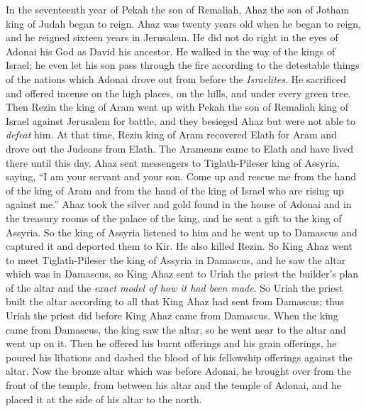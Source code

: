 \begin{biblechapter} %
 In the seventeenth year of Pekah the son of Remaliah, Ahaz the son of Jotham king of Judah began to reign.
\verse Ahaz was twenty years old when he began to reign, and he reigned sixteen years in Jerusalem. He did not do right in the eyes of Adonai his God as David his ancestor.
\verse He walked in the way of the kings of Israel; he even let his son pass through the fire according to the detestable things of the nations which Adonai drove out from before the \textit{Israelites}.
\verse He sacrificed and offered incense on the high places, on the hills, and under every green tree.
\verse Then Rezin the king of Aram went up with Pekah the son of Remaliah king of Israel against Jerusalem for battle, and they besieged Ahaz but were not able to \textit{defeat} him.
\verse At that time, Rezin king of Aram recovered Elath for Aram and drove out the Judeans from Elath. The Arameans came to Elath and have lived there until this day.
\verse Ahaz sent messengers to Tiglath-Pileser king of Assyria, saying, “I am your servant and your son. Come up and rescue me from the hand of the king of Aram and from the hand of the king of Israel who are rising up against me.”
\verse Ahaz took the silver and gold found in the house of Adonai and in the treasury rooms of the palace of the king, and he sent a gift to the king of Assyria.
\verse So the king of Assyria listened to him and he went up to Damascus and captured it and deported them to Kir. He also killed Rezin.
 So King Ahaz went to meet Tiglath-Pileser the king of Assyria in Damascus, and he saw the altar which was in Damascus, so King Ahaz sent to Uriah the priest the builder’s plan of the altar and the \textit{exact model of how it had been made}.
\verse So Uriah the priest built the altar according to all that King Ahaz had sent from Damascus; thus Uriah the priest did before King Ahaz came from Damascus.
\verse When the king came from Damascus, the king saw the altar, so he went near to the altar and went up on it.
\verse Then he offered his burnt offerings and his grain offerings, he poured his libations and dashed the blood of his fellowship offerings against the altar.
\verse Now the bronze altar which was before Adonai, he brought over from the front of the temple, from between his altar and the temple of Adonai, and he placed it at the side of his altar to the north.

\end{biblechapter}
